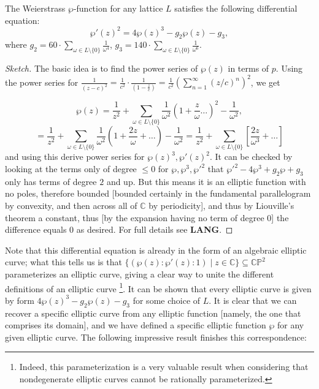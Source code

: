 \begin{proposition}
    The Weierstrass $\wp$-function for any lattice $L$ satisfies the following differential equation:
\[\wp' (z)^2 = 4 \wp(z)^3 - g_2 \wp(z)- g_3,\]where $g_2 = 60 \cdot \sum_{\omega \in L \setminus \{ 0\}} \frac{1}{\omega^4}$, $g_3 = 140 \cdot \sum_{\omega \in L \setminus \{ 0\}} \frac{1}{\omega^6}$. 
\end{proposition}

\begin{proof}[Sketch]
    The basic idea is to find the power series of $\wp(z)$ in terms of $p$. Using the power series for $\frac{1}{(z - c)^2} = \frac{1}{c^2} \cdot \frac{1}{(1 - \frac{z}{c})} = \frac{1}{c^2} (\sum_{n=1}^\infty  (z/c)^{n})^2$, we get

\[\wp(z) = \frac{1}{z^2} + \sum_{\omega \in L \setminus \{ 0\}} \frac{1}{\omega^2} \left( 1 + \frac{z}{\omega} \dots \right)^2 - \frac{1}{\omega^2},\]
\[ = \frac{1}{z^2} + \sum_{\omega \in L \setminus \{ 0\}} \frac{1}{\omega^2} \left( 1 + \frac{2 z}{\omega} + \dots \right) - \frac{1}{\omega^2}  = \frac{1}{z^2} + \sum_{\omega \in L \setminus \{ 0\}} [\frac{2z}{\omega^3} + \dots]\]
and using this derive power series for $\wp(z)^3, \wp'(z)^2$. It can be checked by looking at the terms only of degree $\leq 0$ for $\wp, \wp^3, \wp'^2$ that $\wp'^2 - 4 \wp^3 + g_2 \wp + g_3$ only has terms of degree $2$ and up. But this means it is an elliptic function with no poles, therefore bounded [bounded certainly in the fundamental parallelogram by convexity, and then across all of $\mathbb{C}$ by periodicity], and thus by Liouville's theorem a constant, thus [by the expansion having no term of degree $0$] the difference equals $0$ as desired. For full details see \textbf{LANG}.
\end{proof}

Note that this differential equation is already in the form of an algebraic elliptic curve; what this tells us is that $ \{ (\wp(z): \wp'(z): 1) \mid z \in \mathbb{C} \} \subseteq \mathbb{CP}^2$ parameterizes an elliptic curve, giving a clear way to unite the different definitions of an elliptic curve \footnote{Indeed, this parameterization is a very valuable result when considering that nondegenerate elliptic curves cannot be rationally parameterized.}. It can be shown that every elliptic curve is given by form $4 \wp(z)^3 - g_2 \wp(z)- g_3$ for some choice of $L$. It is clear that we can recover a specific elliptic curve from any elliptic function [namely, the one that comprises its domain], and we have defined a specific elliptic function $\wp$ for any given elliptic curve. The following impressive result finishes this correspondence:


